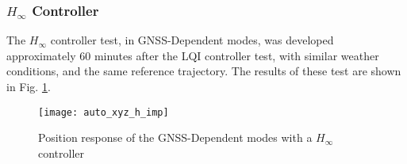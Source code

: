 

\subsubsection{$H_\infty$ Controller}
The $H_\infty$ controller test, in GNSS-Dependent modes, was developed approximately $60$ minutes after the LQI controller test, with similar weather conditions, and the same reference trajectory. The results of these test are shown in Fig. \ref{fig:auto_xyz_h_imp}.
\begin{figure}[H]
	\begin{center}
	\texttt{[image: auto\_xyz\_h\_imp]}
	\caption{Position response of the GNSS-Dependent modes with a $H_\infty$ controller}
	\label{fig:auto_xyz_h_imp}
	\end{center}
	\end{figure}
%	


